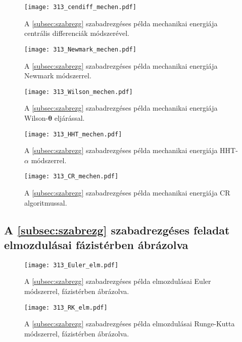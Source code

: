 \begin{figure}[H]
\centering
\texttt{[image: 313\_cendiff\_mechen.pdf]}
\caption{A \ref{subsec:szabrezg} szabadrezgéses példa mechanikai energiája centrális differenciák módszerével.}
\end{figure}

\begin{figure}[H]
\centering
\texttt{[image: 313\_Newmark\_mechen.pdf]}
\caption{A \ref{subsec:szabrezg} szabadrezgéses példa mechanikai energiája Newmark módszerrel.}
\end{figure}

\begin{figure}[H]
\centering
\texttt{[image: 313\_Wilson\_mechen.pdf]}
\caption{A \ref{subsec:szabrezg} szabadrezgéses példa mechanikai energiája Wilson-$\boldsymbol\theta$ eljárással.}
\end{figure}

\begin{figure}[H]
\centering
\texttt{[image: 313\_HHT\_mechen.pdf]}
\caption{A \ref{subsec:szabrezg} szabadrezgéses példa mechanikai energiája HHT-$\alpha$ módszerrel.}
\end{figure}

\begin{figure}[H]
\centering
\texttt{[image: 313\_CR\_mechen.pdf]}
\caption{A \ref{subsec:szabrezg} szabadrezgéses példa mechanikai energiája CR algoritmussal.}
\end{figure}

\subsection{A \ref{subsec:szabrezg} szabadrezgéses feladat elmozdulásai fázistérben ábrázolva}\label{sec:függ_szabrezg_fázis}


\begin{figure}[H]
\centering
\texttt{[image: 313\_Euler\_elm.pdf]}
\caption{A \ref{subsec:szabrezg} szabadrezgéses példa elmozdulásai Euler módszerrel, fázistérben ábrázolva.}
\end{figure}

\begin{figure}[H]
\centering
\texttt{[image: 313\_RK\_elm.pdf]}
\caption{A \ref{subsec:szabrezg} szabadrezgéses példa elmozdulásai Runge-Kutta módszerrel, fázistérben ábrázolva.}
\end{figure}

